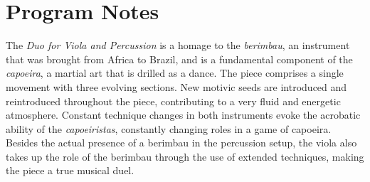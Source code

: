 \section*{Program Notes}

The \emph{Duo for Viola and Percussion} is a homage to the \emph{berimbau}, an instrument that was brought from Africa to Brazil, and is a fundamental component of the \emph{capoeira}, a martial art that is drilled as a dance. The piece comprises a single movement with three evolving sections. New motivic seeds are introduced and reintroduced throughout the piece, contributing to a very fluid and energetic atmosphere. Constant technique changes in both instruments evoke the acrobatic ability of the \emph{capoeiristas}, constantly changing roles in a game of capoeira. Besides the actual presence of a berimbau in the percussion setup, the viola also takes up the role of the berimbau through the use of extended techniques, making the piece a true musical duel.
